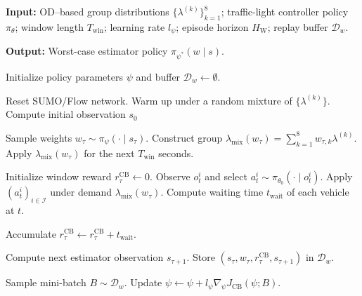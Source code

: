 \documentclass{ifacconf}
\newcommand{\1}{\mbox{1}\hspace{-0.25em}\mbox{l}}
\begin{document}

\begin{algorithm}[t!]
\caption{Contextual-bandit worst-case estimator}
\label{alg:worst}
\begin{algorithmic}[1]

\State \textbf{Input:} OD--based group distributions $\{\lambda^{(k)}\}_{k=1}^8$;
traffic-light controller policy $\pi_\theta$;
window length $T_{\mathrm{win}}$;
learning rate $l_\psi$;
episode horizon $H_{\mathrm{W}}$;
replay buffer $\mathcal{D}_w$.

\State \textbf{Output:} Worst-case estimator policy $\pi_{\psi^\ast}(w \mid s)$.

\State Initialize policy parameters $\psi$ and buffer $\mathcal{D}_w \gets \emptyset$.

    \State Reset SUMO/Flow network.
    \State Warm up under a random mixture of $\{\lambda^{(k)}\}$.
    \State Compute initial observation $s_0$ 

        \State Sample weights $w_\tau \sim \pi_\psi(\cdot \mid s_\tau)$.
        \State Construct group $\lambda_{\mathrm{mix}}(w_\tau) = \sum_{k=1}^8 w_{\tau,k}\lambda^{(k)}$.
        \State Apply $\lambda_{\mathrm{mix}}(w_\tau)$ for the next $T_{\mathrm{win}}$ seconds.

        \State Initialize window reward $r_\tau^{\mathrm{CB}} \gets 0$.
                \State Observe $o_t^i$ and select $a_t^i \sim \pi_{\theta_0}(\cdot \mid o_t^i)$.
            \EndFor
             \State Apply $(a_t^i)_{i\in\mathcal{I}}$ under demand $\lambda_{\mathrm{mix}}(w_\tau)$.
            \State Compute waiting time $t_{\mathrm{wait}}$ of each vehicle at $t$.
            
            \State Accumulate $r_\tau^{\mathrm{CB}} \gets r_\tau^{\mathrm{CB}} +t_{\mathrm{wait}}$.
        \EndFor

        \State Compute next estimator observation $s_{\tau+1}$.
        \State Store $(s_\tau, w_\tau, r_\tau^{\mathrm{CB}}, s_{\tau+1})$ in $\mathcal{D}_w$.

    \EndFor
    \State Sample mini-batch $B \sim \mathcal{D}_w$.
    \State Update $\psi \gets \psi + l_\psi \nabla_\psi J_{\mathrm{CB}}(\psi; B)$.
\EndFor

\end{algorithmic}
\end{algorithm}
\end{document}
